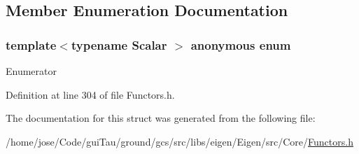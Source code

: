 \subsection{Member Enumeration Documentation}
\hypertarget{structei__functor__traits_3_01ei__scalar__quotient1__impl_3_01_scalar_00_01true_01_4_01_4_a7b3ed83b8cfdb224ae11a0665753feab}{\subsubsection[{anonymous enum}]{\setlength{\rightskip}{0pt plus 5cm}template$<$typename Scalar $>$ anonymous enum}}\label{structei__functor__traits_3_01ei__scalar__quotient1__impl_3_01_scalar_00_01true_01_4_01_4_a7b3ed83b8cfdb224ae11a0665753feab}
\begin{Desc}
\item[Enumerator]\par
\begin{description}
\item[{\em 
\hypertarget{structei__functor__traits_3_01ei__scalar__quotient1__impl_3_01_scalar_00_01true_01_4_01_4_a7b3ed83b8cfdb224ae11a0665753feabaffb15a9ff6d87444eccd53b23206db78}{Cost}\label{structei__functor__traits_3_01ei__scalar__quotient1__impl_3_01_scalar_00_01true_01_4_01_4_a7b3ed83b8cfdb224ae11a0665753feabaffb15a9ff6d87444eccd53b23206db78}
}]\end{description}
\end{Desc}


Definition at line 304 of file Functors.\-h.



The documentation for this struct was generated from the following file\-:\begin{DoxyCompactItemize}
\item 
/home/jose/\-Code/gui\-Tau/ground/gcs/src/libs/eigen/\-Eigen/src/\-Core/\hyperlink{_core_2_functors_8h}{Functors.\-h}\end{DoxyCompactItemize}
